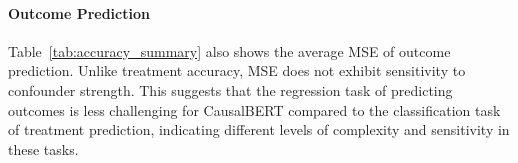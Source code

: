 \documentclass[11pt]{article}
\begin{document}
 

\begin{table}[ht]
\centering
{}
\caption{Average treatment classification accuracy and outcome MSE using CausalBERT(\(\alpha\)=0.33) for different confounder strength $p$ and true ATE $u$.}
\label{tab:accuracy_summary}
\end{table}











\paragraph{Outcome Prediction} 

Table~\ref{tab:accuracy_summary} also shows the average MSE of outcome prediction. Unlike treatment accuracy, MSE does not exhibit sensitivity to confounder strength. This suggests that the regression task of predicting outcomes is less challenging for CausalBERT compared to the classification task of treatment prediction, indicating different levels of complexity and sensitivity in these tasks.




\end{document}
